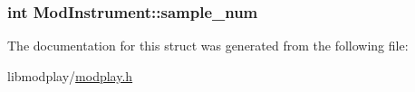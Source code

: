 \subsubsection[{sample\+\_\+num}]{\setlength{\rightskip}{0pt plus 5cm}int Mod\+Instrument\+::sample\+\_\+num}\label{structModInstrument_a573f5fd3a0901038aa7cf4594429a0ca}


The documentation for this struct was generated from the following file\+:\begin{DoxyCompactItemize}
\item 
libmodplay/\hyperlink{modplay_8h}{modplay.\+h}\end{DoxyCompactItemize}
